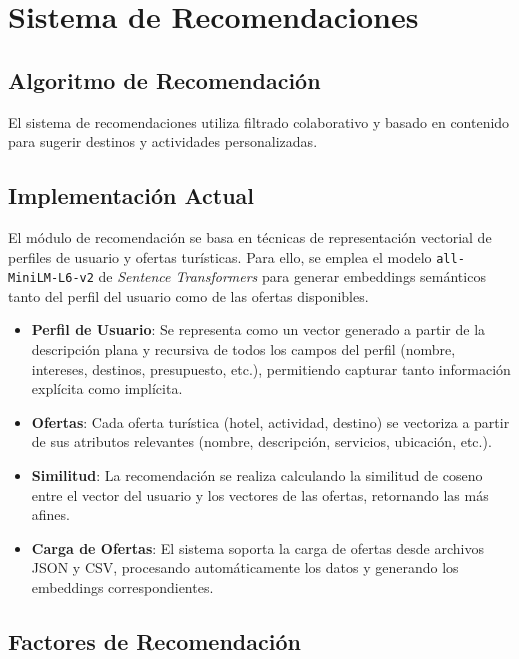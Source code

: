 \documentclass[runningheads]{llncs}
\begin{document}
\section{Sistema de Recomendaciones}

\subsection{Algoritmo de Recomendación}

El sistema de recomendaciones utiliza filtrado colaborativo y basado en contenido para sugerir destinos y actividades personalizadas.

\subsection{Implementación Actual}

El módulo de recomendación se basa en técnicas de representación vectorial de perfiles de usuario y ofertas turísticas. Para ello, se emplea el modelo \texttt{all-MiniLM-L6-v2} de \textit{Sentence Transformers} para generar embeddings semánticos tanto del perfil del usuario como de las ofertas disponibles.

\begin{itemize}
    \item \textbf{Perfil de Usuario}: Se representa como un vector generado a partir de la descripción plana y recursiva de todos los campos del perfil (nombre, intereses, destinos, presupuesto, etc.), permitiendo capturar tanto información explícita como implícita.
    \item \textbf{Ofertas}: Cada oferta turística (hotel, actividad, destino) se vectoriza a partir de sus atributos relevantes (nombre, descripción, servicios, ubicación, etc.).
    \item \textbf{Similitud}: La recomendación se realiza calculando la similitud de coseno entre el vector del usuario y los vectores de las ofertas, retornando las más afines.
    \item \textbf{Carga de Ofertas}: El sistema soporta la carga de ofertas desde archivos JSON y CSV, procesando automáticamente los datos y generando los embeddings correspondientes.
\end{itemize}


\subsection{Factores de Recomendación}
\end{document}

